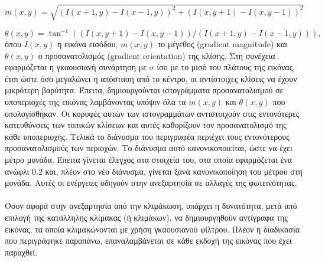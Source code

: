 \begin{equation}
m(x,y) = \sqrt{(I(x+1,y) - I(x-1,y))^2 + (I(x,y+1) - I(x,y-1))^2}
\end{equation}

\begin{equation}
\theta(x,y) = \tan^{-1}((I(x,y+1)-I(x,y-1))/(I(x+1,y)-I(x-1,y))),
\end{equation}
όπου $I(x,y)$ η εικόνα εισόδου, $m(x,y)$ το μέγεθος (gradient magnitude) και $\theta(x,y)$ ο προσανατολισμός (gra\-dient orientation) της κλίσης. Στη συνέχεια εφαρμόζεται η γκαουσιανή συνάρτηση με $\sigma$ ίσο με το μισό του πλάτους της εικόνας, έτσι ώστε όσο μεγαλώνει η απόσταση από το κέντρο, οι αντίστοιχες κλίσεις να έχουν μικρότερη βαρύτητα. Έπειτα, δημιουργούνται ιστογράμματα προσανατολισμού σε υποπεριοχές της εικόνας λαμβάνοντας υπόψιν όλα τα $m(x,y)$ και $\theta(x,y)$ που υπολογίσθηκαν. Οι κορυφές αυτών των ιστογραμμάτων αντιστοιχούν στις εντονότερες κατευθύνσεις των τοπικών κλίσεων και αυτές καθορίζουν τον προσανατολισμό της κάθε υποπεριοχής. Τελικά το διάνυσμα του περιγραφέα περιέχει τους εντονότερους προσανατολισμούς των περιοχών. Το διάνυσμα αυτό κανονικοποιείται, ώστε να έχει μέτρο μονάδα. Έπειτα γίνεται έλεγχος στα στοιχεία του, στα οποία εφαρμόζεται ένα ανώφλι 0.2 και, πλέον στο νέο διάνυσμα, γίνεται ξανά κανονικοποίηση του μέτρου στη μονάδα. Αυτές οι ενέργειες οδηγούν στην ανεξαρτησία σε αλλαγές της φωτεινότητας.

\paragraph*{}
Όσον αφορά στην ανεξαρτησία από την κλιμάκωση, υπάρχει η δυνατότητα, μετά από επιλογή της κατάλληλης κλίμακας (ή κλιμάκων), να δημιουργηθούν αντίγραφα της εικόνας, τα οποία κλιμακώνονται με χρήση γκαουσιανού φίλτρου. Πλέον η διαδικασία που περιγράφηκε παραπάνω, επαναλαμβάνεται σε κάθε εκδοχή της εικόνας που έχει παραχθεί.




